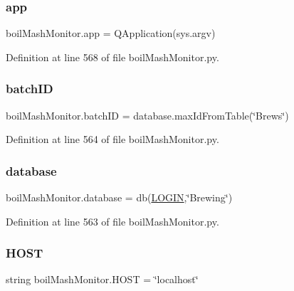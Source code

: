 \subsubsection{\texorpdfstring{app}{app}}
{\footnotesize\ttfamily boil\+Mash\+Monitor.\+app = Q\+Application(sys.\+argv)}



Definition at line 568 of file boil\+Mash\+Monitor.\+py.

\mbox{\label{namespaceboil_mash_monitor_a92c0da44566d11f8b05a97da7dd7c72d}} 
\subsubsection{\texorpdfstring{batchID}{batchID}}
{\footnotesize\ttfamily boil\+Mash\+Monitor.\+batch\+ID = database.\+max\+Id\+From\+Table(\char`\"{}Brews\char`\"{})}



Definition at line 564 of file boil\+Mash\+Monitor.\+py.

\mbox{\label{namespaceboil_mash_monitor_a4ef2a42c3df0b871a7b50b94074ff6a9}} 
\subsubsection{\texorpdfstring{database}{database}}
{\footnotesize\ttfamily boil\+Mash\+Monitor.\+database = db(\mbox{\hyperlink{namespaceboil_mash_monitor_a8408c26ef74bdfc75af04aba577b439d}{L\+O\+G\+IN}},\char`\"{}Brewing\char`\"{})}



Definition at line 563 of file boil\+Mash\+Monitor.\+py.

\mbox{\label{namespaceboil_mash_monitor_aaf393e03ba47fb4d4cd4da6a0b885b6f}} 
\subsubsection{\texorpdfstring{HOST}{HOST}}
{\footnotesize\ttfamily string boil\+Mash\+Monitor.\+H\+O\+ST = \char`\"{}localhost\char`\"{}}



